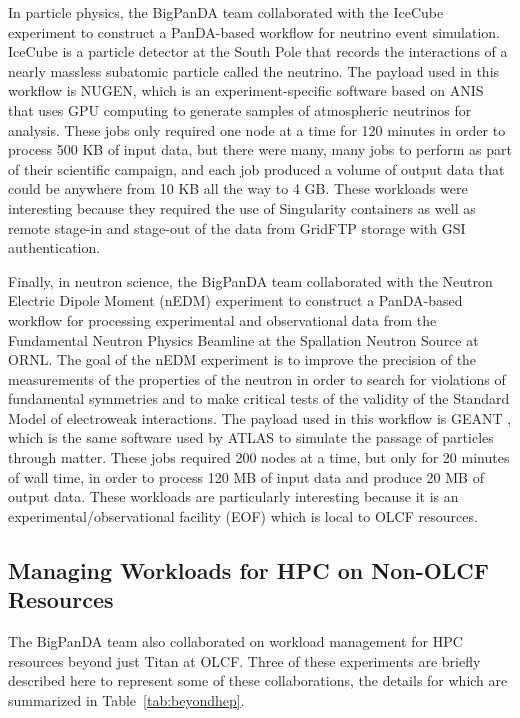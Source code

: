 In particle physics, the BigPanDA team collaborated with the IceCube experiment
\cite{Halzen:2010yj} to construct a PanDA-based workflow for neutrino event
simulation. IceCube is a particle detector at the South Pole that records the
interactions of a nearly massless subatomic particle called the neutrino. The
payload used in this workflow is NUGEN, which is an experiment-specific
software based on ANIS \cite{Gazizov:2004va} that uses GPU computing to
generate samples of atmospheric neutrinos for analysis. These jobs only
required one node at a time for 120 minutes in order to process 500 KB of input
data, but there were many, many jobs to perform as part of their scientific
campaign, and each job produced a volume of output data that could be anywhere
from 10 KB all the way to 4 GB. These workloads were interesting because they
required the use of Singularity containers \cite{} as well as remote stage-in
and stage-out of the data from GridFTP \cite{Allcock:2005:GSG:1105760.1105819}
storage with GSI authentication.

Finally, in neutron science, the BigPanDA team collaborated with the Neutron
Electric Dipole Moment (nEDM) experiment \cite{0954-3899-36-10-104002} to
construct a PanDA-based workflow for processing experimental and observational
data from the Fundamental Neutron Physics Beamline at the Spallation Neutron
Source at ORNL. The goal of the nEDM experiment is to improve the precision of
the measurements of the properties of the neutron in order to search for
violations of fundamental symmetries and to make critical tests of the validity
of the Standard Model of electroweak interactions. The payload used in this
workflow is GEANT \cite{}, which is the same software used by ATLAS to simulate
the passage of particles through matter. These jobs required 200 nodes at a
time, but only for 20 minutes of wall time, in order to process 120 MB of input
data and produce 20 MB of output data. These workloads are particularly
interesting because it is an experimental/observational facility (EOF) which is
local to OLCF resources.


\subsection{Managing Workloads for HPC on Non-OLCF Resources}
\label{subsec:other-hpc-resources}


The BigPanDA team also collaborated on workload management for HPC resources
beyond just Titan at OLCF. Three of these experiments are briefly described
here to represent some of these collaborations, the details for which are
summarized in Table~\ref{tab:beyondhep}.

